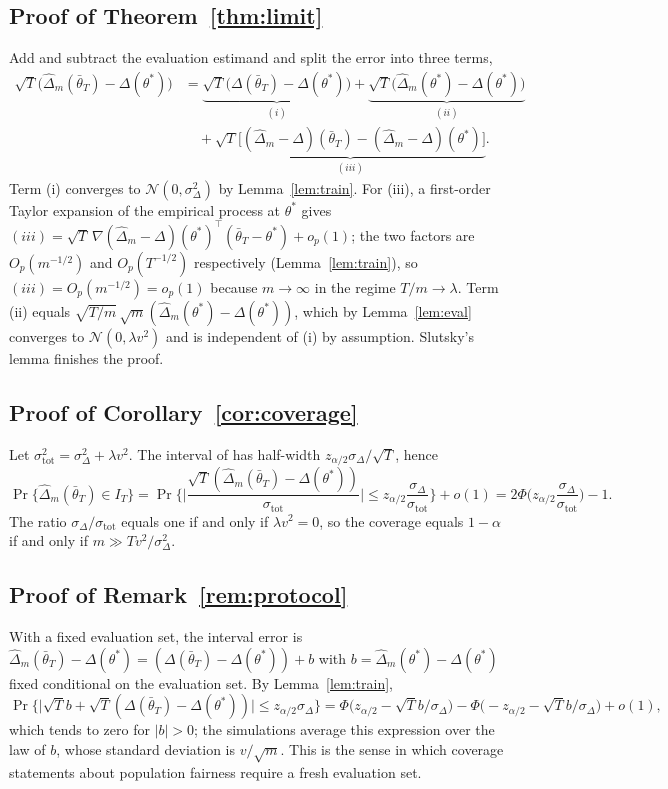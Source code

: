 \documentclass[10pt,twocolumn]{article}
\newcommand{\dhat}{\hat\Delta}
\newcommand{\tbar}{\bar\theta}
\begin{document}
\subsection{Proof of Theorem~\ref{thm:limit}}
Add and subtract the evaluation estimand and split the error into three terms,
\begin{align*}
\sqrt T\big(\dhat_m(\tbar_T)-\Delta(\theta^*)\big)
&=\underbrace{\sqrt T\big(\Delta(\tbar_T)-\Delta(\theta^*)\big)}_{(i)}
+\underbrace{\sqrt T\big(\dhat_m(\theta^*)-\Delta(\theta^*)\big)}_{(ii)}\\
&\quad+\underbrace{\sqrt T\big[(\dhat_m-\Delta)(\tbar_T)-(\dhat_m-\Delta)(\theta^*)\big]}_{(iii)}.
\end{align*}
Term (i) converges to $\mathcal N(0,\sigma^2_\Delta)$ by Lemma~\ref{lem:train}.  For (iii), a
first-order Taylor expansion of the empirical process at $\theta^*$ gives
$(iii)=\sqrt T\,\nabla(\dhat_m-\Delta)(\theta^*)^\top(\tbar_T-\theta^*)+o_p(1)$; the two factors are
$O_p(m^{-1/2})$ and $O_p(T^{-1/2})$ respectively (Lemma~\ref{lem:train}), so
$(iii)=O_p(m^{-1/2})=o_p(1)$ because $m\to\infty$ in the regime $T/m\to\lambda$.  Term (ii) equals
$\sqrt{T/m}\,\sqrt m(\dhat_m(\theta^*)-\Delta(\theta^*))$, which by Lemma~\ref{lem:eval} converges to
$\mathcal N(0,\lambda v^2)$ and is independent of (i) by assumption.  Slutsky's lemma finishes the
proof.

\subsection{Proof of Corollary~\ref{cor:coverage}}
Let $\sigma_{\mathrm{tot}}^2=\sigma^2_\Delta+\lambda v^2$.  The interval of \citet{roy2026uq} has
half-width $z_{\alpha/2}\sigma_\Delta/\sqrt T$, hence
\[
\Pr\{\dhat_m(\tbar_T)\in I_T\}
=\Pr\Big\{\Big|\frac{\sqrt T(\dhat_m(\tbar_T)-\Delta(\theta^*))}{\sigma_{\mathrm{tot}}}\Big|
\le z_{\alpha/2}\frac{\sigma_\Delta}{\sigma_{\mathrm{tot}}}\Big\}+o(1)
=2\Phi\Big(z_{\alpha/2}\frac{\sigma_\Delta}{\sigma_{\mathrm{tot}}}\Big)-1 .
\]
The ratio $\sigma_\Delta/\sigma_{\mathrm{tot}}$ equals one if and only if $\lambda v^2=0$, so the
coverage equals $1-\alpha$ if and only if $m\gg Tv^2/\sigma^2_\Delta$.

\subsection{Proof of Remark~\ref{rem:protocol}}
With a fixed evaluation set, the interval error is
$\dhat_m(\tbar_T)-\Delta(\theta^*)=(\Delta(\tbar_T)-\Delta(\theta^*))+b$ with
$b=\dhat_m(\theta^*)-\Delta(\theta^*)$ fixed conditional on the evaluation set.  By
Lemma~\ref{lem:train},
\[
\Pr\Big\{\big|\sqrt T b+\sqrt T(\Delta(\tbar_T)-\Delta(\theta^*))\big|\le z_{\alpha/2}\sigma_\Delta\Big\}
=\Phi\big(z_{\alpha/2}-\sqrt T b/\sigma_\Delta\big)-\Phi\big(-z_{\alpha/2}-\sqrt T b/\sigma_\Delta\big)+o(1),
\]
which tends to zero for $|b|>0$; the simulations average this expression over the law of $b$, whose
standard deviation is $v/\sqrt m$.  This is the sense in which coverage statements about population
fairness require a fresh evaluation set.
\end{document}
